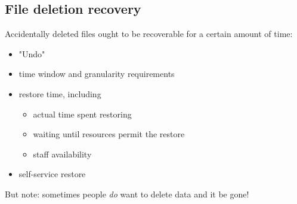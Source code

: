 \documentclass[xga]{xdvislides}
\begin{document}
\subsection{File deletion recovery}
Accidentally deleted files ought to be recoverable for
a certain amount of time:
\begin{itemize}
	\item "Undo"
	\item time window and granularity requirements
	\item restore time, including
		\begin{itemize}
			\item actual time spent restoring
			\item waiting until resources permit the restore
			\item staff availability
		\end{itemize}
	\item self-service restore
\end{itemize}
\vspace{.5in}
But note: sometimes people {\em do} want to delete
data and it be gone!

 
\end{document}
